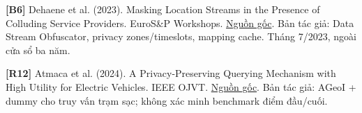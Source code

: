 \documentclass[10pt,a4paper]{article}
\begin{document}
\par\hypertarget{ref-B6}{}\textbf{[B6]} Dehaene et al. (2023). Masking Location Streams in the Presence of Colluding Service Providers. EuroS\&P Workshops. \href{https://lirias.kuleuven.be/bitstream/20.500.12942/720391/2/Data_Stream_Obfuscator_camera_ready.pdf}{Nguồn gốc}. Bản tác giả: Data Stream Obfuscator, privacy zones/timeslots, mapping cache. Tháng 7/2023, ngoài cửa sổ ba năm.
\par\hypertarget{ref-R12}{}\textbf{[R12]} Atmaca et al. (2024). A Privacy-Preserving Querying Mechanism with High Utility for Electric Vehicles. IEEE OJVT. \href{https://wrap.warwick.ac.uk/id/eprint/183198/1/WRAP-privacy-preserving-querying-mechanism-high-utility-electric-vehicles-2024.pdf}{Nguồn gốc}. Bản tác giả: AGeoI + dummy cho truy vấn trạm sạc; không xác minh benchmark điểm đầu/cuối.
\end{document}
